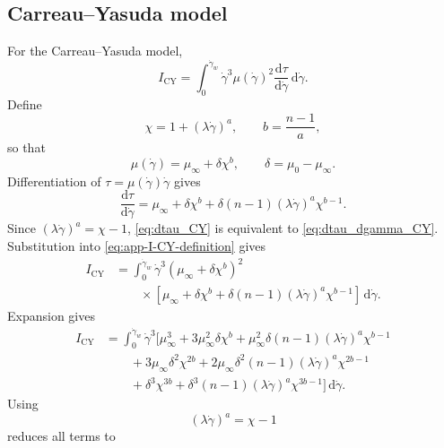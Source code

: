 \documentclass[lineno]{jfm}
\begin{document}
\subsection{Carreau--Yasuda model}
For the Carreau--Yasuda model,
\begin{equation}
I_{\mathrm{CY}}
=
\int_0^{\dot\gamma_w}
\dot\gamma^3
\mu(\dot\gamma)^2
\frac{\mathrm{d}\tau}{\mathrm{d}\dot\gamma}
\,\mathrm{d}\dot\gamma .
\label{eq:app-I-CY-definition}
\end{equation}
Define
\begin{equation}
\chi
=
1+(\lambda\dot\gamma)^a,
\qquad
b
=
\frac{n-1}{a},
\label{eq:app-chi-CY}
\end{equation}
so that
\begin{equation}
\mu(\dot\gamma)
=
\mu_\infty+\delta\chi^b,
\qquad
\delta=\mu_0-\mu_\infty .
\label{eq:app-mu-CY}
\end{equation}
Differentiation of
$\tau=\mu(\dot\gamma)\dot\gamma$ gives
\begin{equation}
\frac{\mathrm{d}\tau}{\mathrm{d}\dot\gamma}
=
\mu_\infty
+\delta\chi^b
+\delta(n-1)
(\lambda\dot\gamma)^a\chi^{b-1}.
\label{eq:dtau_CY}
\end{equation}
Since $(\lambda\dot\gamma)^a=\chi-1$,
\eqref{eq:dtau_CY} is equivalent to
\eqref{eq:dtau_dgamma_CY}.
Substitution into \eqref{eq:app-I-CY-definition} gives
\begin{align}
I_{\mathrm{CY}}
&=
\int_0^{\dot{\gamma}_w}
\dot{\gamma}^3
\left(\mu_{\infty}+\delta\chi^b\right)^2
\nonumber\\
&\qquad\times
\left[
\mu_{\infty}
+\delta\chi^b
+\delta(n-1)
(\lambda\dot{\gamma})^a\chi^{b-1}
\right]
\,\mathrm{d}\dot{\gamma}.
\label{eq:app-I-CY-start}
\end{align}
Expansion gives
\begin{align}
I_{\mathrm{CY}}
&=
\int_0^{\dot\gamma_w}
\dot\gamma^3
\Big[
\mu_\infty^3
+3\mu_\infty^2\delta\chi^b
+\mu_\infty^2\delta(n-1)
(\lambda\dot\gamma)^a\chi^{b-1}
\nonumber\\
&\qquad
+3\mu_\infty\delta^2\chi^{2b}
+2\mu_\infty\delta^2(n-1)
(\lambda\dot\gamma)^a\chi^{2b-1}
\nonumber\\
&\qquad
+\delta^3\chi^{3b}
+\delta^3(n-1)
(\lambda\dot\gamma)^a\chi^{3b-1}
\Big]
\,\mathrm{d}\dot\gamma .
\label{eq:app-I-CY-expanded}
\end{align}
Using
\begin{equation}
(\lambda\dot\gamma)^a=\chi-1
\label{eq:app-CY-identity}
\end{equation}
reduces all terms to
\end{document}

